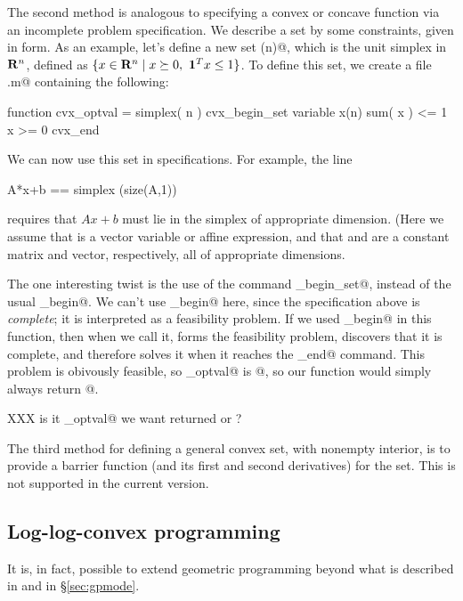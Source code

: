 \documentclass[12pt]{article}
\newcommand{\ones}{\mathbf 1}
\begin{document}
The second method is analogous to specifying a convex or concave
function via an incomplete \cvx problem specification.
We describe a set by some constraints, given in \cvx form.
As an example, let's define a new set \verb@simplex(n)@, which is the
unit simplex in $\R^n$, defined as $\{x \in \R^n \;|\; 
x \succeq 0,~\ones^T x\leq 1 \}$.
To define this set, we create a file \verb@simplex.m@ containing
the following:
\begin{code}
function cvx_optval = simplex( n )
cvx_begin_set
variable x(n)
sum( x ) <= 1
x >= 0
cvx_end
\end{code}
We can now use this set in \cvx specifications.  For example, 
the line
\begin{code}
	A*x+b == simplex (size(A,1)) 
\end{code}
requires that $Ax+b$ must lie in the simplex of appropriate
dimension.
(Here we assume that \verb@x@ is a vector variable or affine
expression, and that \verb@A@ and \verb@b@ are a constant
matrix and vector, respectively, all of appropriate dimensions.

The one interesting twist is the use of the command 
\verb@cvx_begin_set@, instead of the usual \verb@cvx_begin@.
We can't use \verb@cvx_begin@ here, since the \cvx specification
above is \emph{complete}; it is interpreted as a feasibility problem.
If we used \verb@cvx_begin@ in this function, then when we call it,
\cvx forms the feasibility problem, discovers that it is complete,
and therefore solves it when it reaches the \verb@cvx_end@ command.
This problem is obivously feasible, so \verb@cvx_optval@ is @,
so our function would simply always return @.

XXX is it \verb@cvx_optval@ we want returned or \verb@x@?

The third method for defining a general convex set, with nonempty
interior, is to provide a barrier function (and its first and 
second derivatives) for the set.
This is not supported in the current version.
\fi

\iffalse
\subsection{Log-log-convex programming}

It is, in fact, possible to extend geometric programming beyond what is
described in \cite{BKVH:05} and in \S\ref{sec:gpmode}. 
\end{document}
